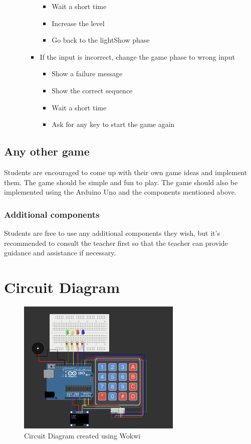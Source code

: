 \documentclass[10pt, oneside]{article}
\theoremstyle{remark}
\begin{document}
\begin{enumerate}
\begin{itemize}
\begin{itemize}
\begin{itemize}
        \item Wait a short time
        \item Increase the level
        \item Go back to the lightShow phase
      \end{itemize}
      \item If the input is incorrect, change the game phase to wrong input
      \begin{itemize}
        \item Show a failure message 
        \item Show the correct sequence
        \item Wait a short time
        \item Ask for any key to start the game again
      \end{itemize}
    \end{itemize}
  \end{itemize}
\end{enumerate}

\subsection{Any other game}
\label{any_other_game}
Students are encouraged to come up with their own game ideas and implement them. The game should be simple and fun to play. The game should also be implemented using the Arduino Uno and the components mentioned above. 

\subsubsection{Additional components}
Students are free to use any additional components they wish, but it’s recommended to consult the teacher first so that the teacher can provide guidance and assistance if necessary.

\section{Circuit Diagram}
\begin{figure}[H]
  \begin{center}
    \includegraphics[width=0.7\textwidth]{CircuitDiagram.png}
  \end{center}
  \caption{Circuit Diagram created using Wokwi}
  \label{fig:circuit_diagram}
\end{figure}
\end{document}

